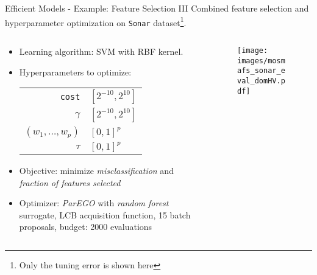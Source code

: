 \begin{frame}{Efficient Models - Example: Feature Selection III}
    Combined feature selection and hyperparameter optimization on \texttt{Sonar} dataset\footnote{Only the tuning error is shown here}.
\begin{columns}
\begin{column}{0.65\textwidth}
  \begin{itemize}
    \item Learning algorithm: SVM with RBF kernel.
    \item Hyperparameters to optimize: \\
    \begin{tabular}{rl}
    \texttt{cost} & $[2^{-10}, 2^{10}]$ \\
    $\gamma$ & $[2^{-10}, 2^{10}]$ \\
    $(w_1, \ldots, w_p)$ & $[0,1]^p$ \\
    $\tau$ & $[0,1]^p$ \\
    \end{tabular}
    \item Objective: minimize \emph{misclassification} and \emph{fraction of features selected}
    \item Optimizer: \emph{ParEGO} with \emph{random forest} surrogate, LCB acquisition function, 15 batch proposals, budget: 2000 evaluations
  \end{itemize}
\end{column}%
\begin{column}{0.35\textwidth}

  \begin{figure}
    \centering
    \texttt{[image: images/mosmafs\_sonar\_eval\_domHV.pdf]}
  \end{figure}

\end{column}
\end{columns}
\end{frame}

